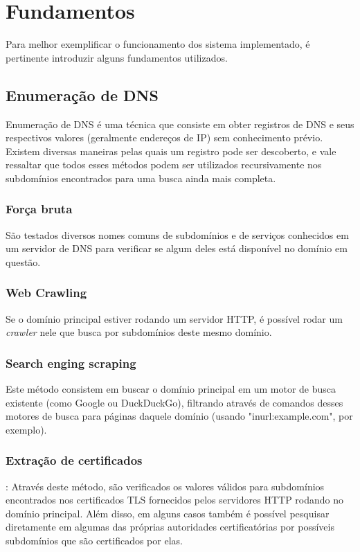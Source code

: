\chapter{Fundamentos}
\label{cap:fundamentos}

Para melhor exemplificar o funcionamento dos sistema implementado, é pertinente introduzir alguns fundamentos utilizados. 

\section{Enumeração de DNS}

Enumeração de DNS é uma técnica que consiste em obter registros de DNS e seus respectivos valores (geralmente endereços de IP) sem conhecimento prévio. Existem diversas maneiras pelas quais um registro pode ser descoberto, e vale ressaltar que todos esses métodos podem ser utilizados recursivamente nos subdomínios encontrados para uma busca ainda mais completa.
        
        \subsection{Força bruta} São testados diversos nomes comuns  de subdomínios e de serviços conhecidos em um servidor de DNS para verificar se algum deles está disponível no domínio em questão.
        
        \subsection{Web Crawling} Se o domínio principal estiver rodando um servidor HTTP, é possível rodar um \textit{crawler} nele que busca por subdomínios deste mesmo domínio.
        
        \subsection{Search enging scraping} Este método consistem em buscar o domínio principal em um motor de busca existente (como Google ou DuckDuckGo), filtrando através de comandos desses motores de busca para páginas daquele domínio (usando "inurl:example.com", por exemplo).
        
        \subsection{Extração de certificados}: Através deste método, são verificados os valores válidos para subdomínios encontrados nos certificados TLS fornecidos pelos servidores HTTP rodando no domínio principal. Além disso, em alguns casos também é possível pesquisar diretamente em algumas das próprias autoridades certificatórias por possíveis subdomínios que são certificados por elas.
        
